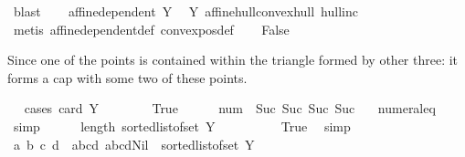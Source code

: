 \begin{isabellebody}
\ blast\isanewline
\ \ \isamarkupfalse%
\ {}{\isacharcolon}{\kern0pt}{\isachardoublequoteopen}affine{\isacharunderscore}{\kern0pt}dependent\ Y{\isachardoublequoteclose}\ \isamarkupfalse%
\ Y{\isacharparenleft}{\kern0pt}{}{\isacharcomma}{\kern0pt}{}{\isacharparenright}{\kern0pt}\ affine{\isacharunderscore}{\kern0pt}hull{\isacharunderscore}{\kern0pt}convex{\isacharunderscore}{\kern0pt}hull\ hull{\isacharunderscore}{\kern0pt}inc\isanewline
\ \ \ \ \isamarkupfalse%
\ {\isacharparenleft}{\kern0pt}metis\ affine{\isacharunderscore}{\kern0pt}dependent{\isacharunderscore}{\kern0pt}def\ convex{\isacharunderscore}{\kern0pt}pos{\isacharunderscore}{\kern0pt}def{\isacharparenright}{\kern0pt}\isanewline
\isanewline
\ \ \isamarkupfalse%
\ False%
\begin{isamarkuptext}%
Since one of the points is contained within the triangle formed by other three: it forms a cap with some two of these points.%
\end{isamarkuptext}\isamarkuptrue%
\ \ \isamarkupfalse%
{\isacharparenleft}{\kern0pt}cases\ {\isachardoublequoteopen}card\ Y\ {\isacharequal}{\kern0pt}\ {}{\isachardoublequoteclose}{\isacharparenright}{\kern0pt}\isanewline
\ \ \ \ \isamarkupfalse%
\ True\isanewline
\ \ \ \ \isamarkupfalse%
\ num{\isacharunderscore}{\kern0pt}{}{\isacharcolon}{\kern0pt}{\isachardoublequoteopen}{}\ {\isacharequal}{\kern0pt}\ Suc\ {\isacharparenleft}{\kern0pt}Suc\ {\isacharparenleft}{\kern0pt}Suc\ {\isacharparenleft}{\kern0pt}Suc\ {}{\isacharparenright}{\kern0pt}{\isacharparenright}{\kern0pt}{\isacharparenright}{\kern0pt}{\isachardoublequoteclose}\ \isamarkupfalse%
\ numeral{\isacharunderscore}{\kern0pt}{}{\isacharunderscore}{\kern0pt}eq{\isacharunderscore}{\kern0pt}{}\ \isamarkupfalse%
\ simp\isanewline
\ \ \ \ \isamarkupfalse%
\ {\isachardoublequoteopen}length\ {\isacharparenleft}{\kern0pt}sorted{\isacharunderscore}{\kern0pt}list{\isacharunderscore}{\kern0pt}of{\isacharunderscore}{\kern0pt}set\ Y{\isacharparenright}{\kern0pt}\ {\isacharequal}{\kern0pt}\ {}{\isachardoublequoteclose}\isanewline
\ \ \ \ \ \ \isamarkupfalse%
\ True\ \isamarkupfalse%
\ simp\isanewline
\ \ \ \ \isamarkupfalse%
\ \isamarkupfalse%
\ a\ b\ c\ d\ \ abcd{\isacharcolon}{\kern0pt}\ {\isachardoublequoteopen}a{\isacharhash}{\kern0pt}b{\isacharhash}{\kern0pt}c{\isacharhash}{\kern0pt}d{\isacharhash}{\kern0pt}Nil\ {\isacharequal}{\kern0pt}\ sorted{\isacharunderscore}{\kern0pt}list{\isacharunderscore}{\kern0pt}of{\isacharunderscore}{\kern0pt}set\ Y{\isachardoublequoteclose}\isanewline

\end{isabellebody}
